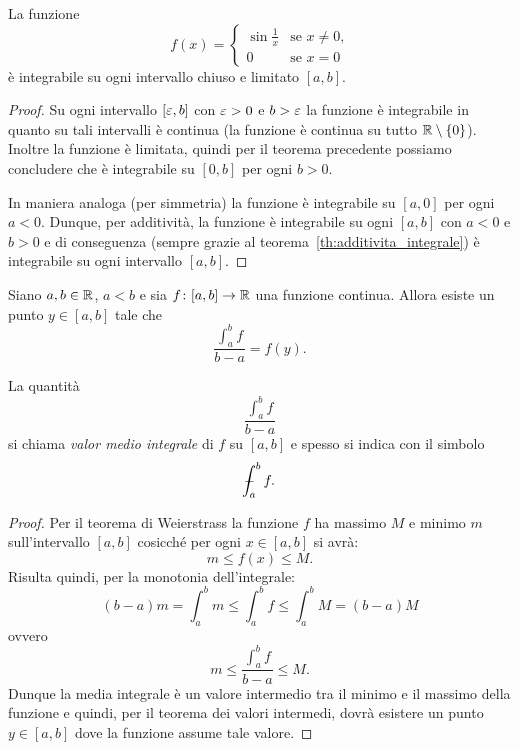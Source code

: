 \begin{example}
La funzione
\[
  f(x) = \begin{cases}
  \sin\frac 1 x & \text{se $x\neq 0$,}\\
  0 & \text{se $x=0$}
  \end{cases}
\]
è integrabile su ogni intervallo chiuso e limitato $[a,b]$.
\end{example}
\begin{proof}
Su ogni intervallo $[\varepsilon,b]$ con $\varepsilon>0$ e $b>\varepsilon$ la funzione
è integrabile in quanto su tali intervalli è continua (la funzione è continua su
tutto $\mathbb R\setminus{\left\{ 0 \right\}}$). Inoltre la funzione è limitata, quindi per il teorema
precedente possiamo concludere che è integrabile su $[0,b]$ per ogni $b>0$.

In maniera analoga (per simmetria) la funzione è integrabile su $[a,0]$
per ogni $a<0$.
Dunque, per additività, la funzione è integrabile su ogni $[a,b]$ con $a<0$ e $b>0$
e di conseguenza (sempre grazie al teorema~\ref{th:additivita_integrale})
è integrabile su ogni intervallo $[a,b]$.
\end{proof}

\begin{theorem}%
  \label{th:media_integrale}%
  \mymark{***}%
  Siano $a,b\in \mathbb R$, $a<b$ e sia
  $f\colon [a,b] \to \mathbb R$ una funzione continua.
  Allora esiste un punto $y \in [a,b]$
  tale che
  \[
  \frac{\int_a^b f}{b-a} = f(y).
  \]
  \end{theorem}
  La quantità
  \[
    \frac{\int_a^b f}{b-a}
  \]
  si chiama \emph{valor medio integrale} di $f$ su $[a,b]$ e spesso
  si indica con il simbolo
  \[
    \dashint_a^b f.
  \]
  \begin{proof}
  \mymark{***}
  Per il teorema di Weierstrass la funzione $f$ ha massimo $M$ e minimo $m$
  sull'intervallo $[a,b]$ cosicché
  per ogni $x\in [a,b]$ si avrà:
  \[
    m \le f(x) \le M.
  \]
  Risulta quindi, per la monotonia dell'integrale:
  \[
    (b-a) m = \int_a^b m \le \int_a^b f \le \int_a^b M = (b-a) M
  \]
  ovvero
  \[
    m \le \frac{\int_a^b f}{b-a} \le M.
  \]
  Dunque la media integrale è un valore intermedio tra il minimo e il massimo
  della funzione e quindi, per il teorema dei valori intermedi,
  dovrà esistere un punto $y\in [a,b]$ dove la funzione assume tale valore.
  \end{proof}
  
